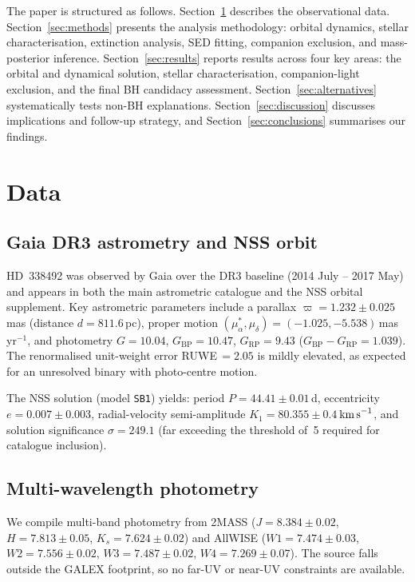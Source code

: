 \documentclass[usenatbib,fleqn]{mnras}
\newcommand{\kms}{{\rm km\,s}^{-1}}
\begin{document}
The paper is structured as follows.  Section~\ref{sec:data}
describes the observational data.  Section~\ref{sec:methods}
presents the analysis methodology: orbital dynamics, stellar
characterisation, extinction analysis, SED fitting, companion
exclusion, and mass-posterior inference.  Section~\ref{sec:results}
reports results across four key areas: the orbital and dynamical
solution, stellar characterisation, companion-light exclusion, and
the final BH candidacy assessment.  Section~\ref{sec:alternatives}
systematically tests non-BH explanations.
Section~\ref{sec:discussion} discusses implications and follow-up
strategy, and Section~\ref{sec:conclusions} summarises our findings.

\section{Data}
\label{sec:data}

\subsection{Gaia DR3 astrometry and NSS orbit}
\label{sec:data:gaia}

HD~338492 was observed by Gaia over the DR3 baseline (2014 July --
2017 May) and appears in both the main astrometric catalogue and the
NSS orbital supplement.  Key astrometric parameters include a
parallax $\varpi = 1.232 \pm 0.025$\,mas (distance
$d = 811.6$\,pc), proper motion
$(\mu_\alpha^*, \mu_\delta) = (-1.025, -5.538)$\,mas\,yr$^{-1}$,
and photometry $G = 10.04$, $G_\mathrm{BP} = 10.47$,
$G_\mathrm{RP} = 9.43$ ($G_\mathrm{BP} - G_\mathrm{RP} = 1.039$).
The renormalised unit-weight error RUWE$\,= 2.05$ is mildly elevated,
as expected for an unresolved binary with photo-centre motion.

The NSS solution (model \texttt{SB1}) yields:
period $P = 44.41 \pm 0.01$\,d,
eccentricity $e = 0.007 \pm 0.003$,
radial-velocity semi-amplitude $K_1 = 80.355 \pm 0.4$\,$\kms$,
and solution significance $\sigma = 249.1$ (far exceeding the
threshold of~5 required for catalogue inclusion).

\subsection{Multi-wavelength photometry}
\label{sec:data:phot}

We compile multi-band photometry from 2MASS
($J = 8.384 \pm 0.02$, $H = 7.813 \pm 0.05$,
$K_s = 7.624 \pm 0.02$) and AllWISE
($W1 = 7.474 \pm 0.03$, $W2 = 7.556 \pm 0.02$,
$W3 = 7.487 \pm 0.02$, $W4 = 7.269 \pm 0.07$).
The source falls outside the GALEX footprint, so no far-UV or
near-UV constraints are available.
\end{document}
